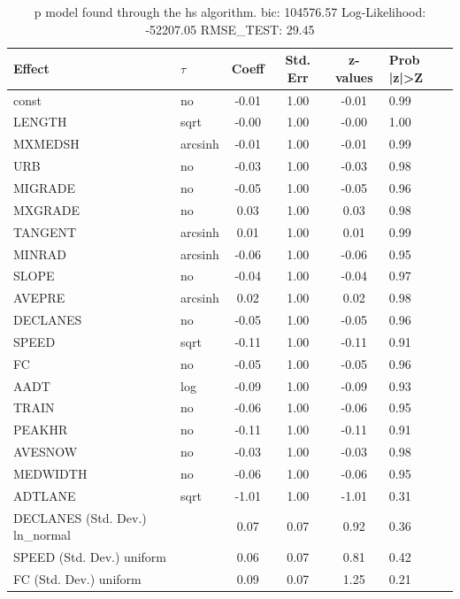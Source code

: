 \begin{table}
	\caption{p model found through the hs algorithm. bic: 104576.57 Log-Likelihood: -52207.05 RMSE_TEST: 29.45}
	\begin{center}
		\begin{tabular}{|l|l|c|c|c|l|}
			\hline
			Effect & $\tau$ & Coeff & Std. Err & z-values & Prob |z|>Z \\
			\hline
			const & no & -0.01 & 1.00 & -0.01 & 0.99 \\
			\hline
			LENGTH & sqrt & -0.00 & 1.00 & -0.00 & 1.00 \\
			\hline
			MXMEDSH & arcsinh & -0.01 & 1.00 & -0.01 & 0.99 \\
			\hline
			URB & no & -0.03 & 1.00 & -0.03 & 0.98 \\
			\hline
			MIGRADE & no & -0.05 & 1.00 & -0.05 & 0.96 \\
			\hline
			MXGRADE & no & 0.03 & 1.00 & 0.03 & 0.98 \\
			\hline
			TANGENT & arcsinh & 0.01 & 1.00 & 0.01 & 0.99 \\
			\hline
			MINRAD & arcsinh & -0.06 & 1.00 & -0.06 & 0.95 \\
			\hline
			SLOPE & no & -0.04 & 1.00 & -0.04 & 0.97 \\
			\hline
			AVEPRE & arcsinh & 0.02 & 1.00 & 0.02 & 0.98 \\
			\hline
			DECLANES & no & -0.05 & 1.00 & -0.05 & 0.96 \\
			\hline
			SPEED & sqrt & -0.11 & 1.00 & -0.11 & 0.91 \\
			\hline
			FC & no & -0.05 & 1.00 & -0.05 & 0.96 \\
			\hline
			AADT & log & -0.09 & 1.00 & -0.09 & 0.93 \\
			\hline
			TRAIN & no & -0.06 & 1.00 & -0.06 & 0.95 \\
			\hline
			PEAKHR & no & -0.11 & 1.00 & -0.11 & 0.91 \\
			\hline
			AVESNOW & no & -0.03 & 1.00 & -0.03 & 0.98 \\
			\hline
			MEDWIDTH & no & -0.06 & 1.00 & -0.06 & 0.95 \\
			\hline
			ADTLANE & sqrt & -1.01 & 1.00 & -1.01 & 0.31 \\
			\hline
			DECLANES (Std. Dev.) ln_normal &  & 0.07 & 0.07 & 0.92 & 0.36 \\
			\hline
			SPEED (Std. Dev.) uniform &  & 0.06 & 0.07 & 0.81 & 0.42 \\
			\hline
			FC (Std. Dev.) uniform &  & 0.09 & 0.07 & 1.25 & 0.21 \\

\end{tabular}
\end{center}
\end{table}
